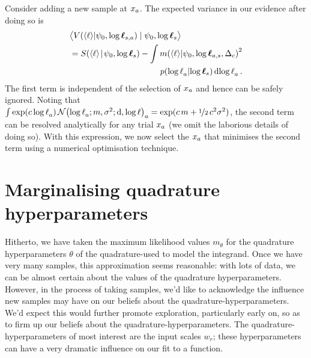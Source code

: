 \documentclass{article}
\begin{document}
Consider adding a new sample at $\lfv_a$. The expected variance in our evidence after doing so is
\begin{align}
&\bigl\langle \cov{\inty{\lfn}}{\psi_0,\tvr_{s,a}}\mid \psi_0,\tvr_{s}\bigr\rangle 
\nonumber\\
& = \secm{\inty{\lfn}}{\psi_0,\tvr_s} 
- \int\mean{\inty{\lfn}}{\psi_0,\tvr_{a,s},\Delta_c}^2\nonumber\\
& \hspace{3.8cm} \p{\tr_a}{\tvr_s}\ud\tr_a\,.\label{eqn:exp_var}
\end{align}
The first term is independent of the selection of $\lfv_a$ and hence can be safely ignored. Noting that $\int \exp(c\, \tr_a)\, \N{\tr_a;m, \sigma^2} \ud\tr_a = \exp(c\, m + \nicefrac{1}{2}\, c^2 \sigma^2)$, the second term can be resolved analytically for any trial $\lfv_a$ (we omit the laborious details of doing so). With this expression, we now select the $\lfv_a$ that minimises the second term using a numerical optimisation technique. 

\section{Marginalising quadrature hyperparameters}

Hitherto, we have taken the maximum likelihood values $m_\theta$ for the quadrature hyperparameters $\theta$ of the quadrature-\gpb used to model the integrand. Once we have very many samples, this approximation seems reasonable: with lots of data, we can be almost certain about the values of the quadrature hyperparameters. However, in the process of taking samples, we'd like to acknowledge the influence new samples may have on our beliefs about the quadrature-hyperparameters. We'd expect this would further promote exploration, particularly early on, so as to firm up our beliefs about the quadrature-hyperparameters. The quadrature-hyperparameters of most interest are the input scales $w_r$; these hyperparameters can have a very dramatic influence on our fit to a function.

\end{document}

